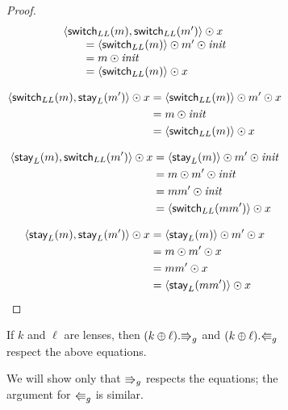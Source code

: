 \begin{figure}
\begin{figure}
\begin{proof}
    \[\begin{array}{l}
        \left<\mathsf{switch}_{LL}(m),\mathsf{switch}_{LL}(m')\right> \odot  x \\
        \qquad= \left<\mathsf{switch}_{LL}(m)\right>\odot {m'\odot \mathit{init}} \\
        \qquad= {m \odot \mathit{init}} \\
        \qquad= \left<\mathsf{switch}_{LL}(m)\right> \odot  x
    \end{array}\]

    \begin{align*}
        \left<\mathsf{switch}_{LL}(m),\mathsf{stay}_L(m')\right> \odot  x
            &= \left<\mathsf{switch}_{LL}(m)\right> \odot {m'\odot x} \\
            &= {m \odot \mathit{init}} \\
            &= \left<\mathsf{switch}_{LL}(m)\right> \odot  x
    \end{align*}

    \begin{align*}
        \left<\mathsf{stay}_L(m),\mathsf{switch}_{LL}(m')\right> \odot  x
            &= \left<\mathsf{stay}_L(m)\right> \odot {m' \odot \mathit{init}} \\
            &= {m \odot m' \odot \mathit{init}} \\
            &= {mm' \odot \mathit{init}} \\
            &= \left<\mathsf{switch}_{LL}(mm')\right> \odot  x
    \end{align*}

    \begin{align*}
        \left<\mathsf{stay}_L(m),\mathsf{stay}_L(m')\right> \odot  x
            &= \left<\mathsf{stay}_L(m)\right> \odot {m' \odot x} \\
            &= {m \odot m' \odot x} \\
            &= {mm' \odot x} \\
            &= \left<\mathsf{stay}_L(mm')\right> \odot  x
    \end{align*}
\end{proof}

\begin{lemma}
    If $k$ and $\ell$ are lenses, then $(k\oplus\ell).\mathord{\Rrightarrow}_g$ and
    $(k\oplus\ell).\mathord{\Lleftarrow}_g$ respect the above equations.
\end{lemma}
\fi

\iffull
\begin{pf}
    We will show only that $\mathord{\Rrightarrow}_g$ respects the equations; the argument
    for $\mathord{\Lleftarrow}_g$ is similar.


\end{pf}
\end{figure}
\end{figure}
